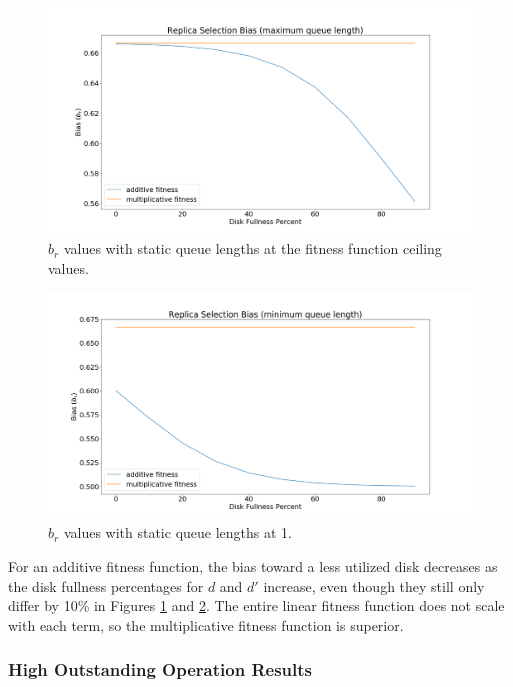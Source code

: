 \documentclass[12pt]{article}
\begin{document}
    \begin{figure}[htbp]
      \centering
      \includegraphics[scale=0.32]{images/replica_selection_bias_max_qlen.png} 
      \caption{$b_r$ values with static queue lengths at the fitness
               function ceiling values.}
      \label{fig:bias_max_qlen}
    \end{figure}

    \begin{figure}[htbp]
      \centering
      \includegraphics[scale=0.32]{images/replica_selection_bias_min_qlen.png} 
      \caption{$b_r$ values with static queue lengths at 1.}
      \label{fig:bias_min_qlen}
    \end{figure}

    For an additive fitness function, the bias toward a less utilized disk
    decreases as the disk fullness percentages for $d$ and $d'$ increase, even
    though they still only differ by 10\% in Figures \ref{fig:bias_max_qlen}
    and \ref{fig:bias_min_qlen}. The entire linear fitness function does not
    scale with each term, so the multiplicative fitness function is superior.

    \subsubsection{High Outstanding Operation Results}
    \label{sec:high-outstanding-ops}
\end{document}
